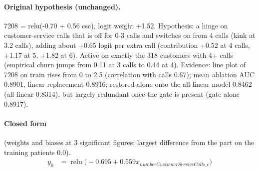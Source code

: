 \documentclass[a4paper,10pt]{article}
\newif\ifreviewmarks
\newcommand{\reviewrule}{\noindent{\color{BrickRed}\rule{\linewidth}{0.8pt}}}
\newenvironment{drafted}[1][]{%
  \ifreviewmarks\par\addvspace{\medskipamount}\reviewrule\par\nopagebreak
  \noindent{\color{BrickRed}\sffamily\footnotesize\textbf{Thesis Draft}\quad #1\hfill review}\par\nopagebreak\smallskip\fi}{%
  \ifreviewmarks\par\smallskip\noindent{\color{BrickRed}\sffamily\footnotesize end of thesis draft}\par\nopagebreak\reviewrule\par\medskip\fi}
\begin{document}
\begin{drafted}[plain-language layer: churn100-s2-c2]
\paragraph{Original hypothesis (unchanged).} 7208 = relu(-0.70 + 0.56 csc), logit weight +1.52. Hypothesis: a hinge on customer-service calls that is off for 0-3 calls and switches on from 4 calls (kink at 3.2 calls), adding about +0.65 logit per extra call (contribution +0.52 at 4 calls, +1.17 at 5, +1.82 at 6). Active on exactly the 318 customers with 4+ calls (empirical churn jumps from 0.11 at 3 calls to 0.44 at 4). Evidence: line plot of 7208 on train rises from 0 to 2.5 (correlation with calls 0.67); mean ablation AUC 0.8901, linear replacement 0.8916; restored alone onto the all-linear model 0.8462 (all-linear 0.8314), but largely redundant once the gate is present (gate alone 0.8917).
\paragraph{Closed form} {\footnotesize(weights and biases at 3 significant figures; largest difference from the part on the training patients 0.0).}
{\small\begingroup\allowdisplaybreaks
\begin{align*}
y_{0} &= \operatorname{relu}\bigl(-0.695 + 0.559 x_{numberCustomerServiceCalls\_c}\bigr)
\end{align*}\endgroup}


\end{drafted}
\end{document}

